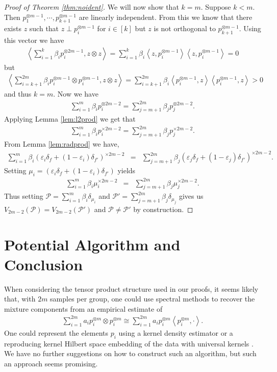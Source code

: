 \documentclass{article} %
\def\l{\left}
\def\r{\right}
\def\sP{\mathscr{P}}
\theoremstyle{definition}
\begin{document}
\begin{proof}[Proof of Theorem \ref{thm:noident}]
We will now show that $k=m$. Suppose $k<m$. Then $p_1^{\otimes m-1}, \cdots , p_{k+1}^{\otimes m-1}$ are linearly independent. From this we know that there exists $z$ such that $z\perp p_i^{\otimes m-1}$ for $i\in [k]$ but $z$ is not orthogonal to $p_{k+1}^{\otimes m-1}$. Using this vector we have
\begin{eqnarray*}
	\l<\sum_{i=1}^{k}\beta_i p_i^{\otimes 2m-1},z\otimes z\r>
	=\sum_{i=1}^{k}\beta_i\l<z, p_i^{\otimes m-1}\r>\l<z, p_i^{\otimes m-1}\r>
	=0 
\end{eqnarray*}
but
\begin{eqnarray*}
	\l< \sum_{i=k+1}^{2m}\beta_i p_i^{\otimes m-1}\otimes p_i^{\otimes m-1}, z\otimes z\r>
	= \sum_{i=k+1}^{2m}\beta_i\l<  p_i^{\otimes m-1}, z\r>\l<  p_i^{\otimes m-1}, z\r>
	>0
\end{eqnarray*}
and thus $k=m$.
Now we have
\begin{eqnarray*}
	\sum_{i=1}^m \beta_i p_i^{\otimes 2m-2} = \sum_{j=m+1}^{2m}\beta_j p_j^{\otimes 2m-2}.
\end{eqnarray*}
Applying Lemma \ref{lem:l2prod} we get that
\begin{eqnarray*}
	\sum_{i=1}^m \beta_i p_i^{\times 2m-2} = \sum_{j=m+1}^{2m}\beta_j p_j^{\times 2m-2}.
\end{eqnarray*}
From Lemma \ref{lem:radprod} we have,
\begin{eqnarray*}
	 \sum_{i=1}^m  \beta_i \left( \varepsilon_i \delta_f + \left( 1-\varepsilon_i \right) \delta_{f'} \right)^{\times 2m-2}   &=& \sum_{j=m+1}^{2m} \beta_j \left( \varepsilon_j \delta_f + \left( 1-\varepsilon_j \right) \delta_{f'} \right)^{\times 2m-2}.
\end{eqnarray*}
Setting $\mu_i = \left( \varepsilon_i \delta_{f} + \left( 1-\varepsilon_i \right)\delta_{f'} \right)$ yields
\begin{eqnarray*}
	\sum_{i=1}^m  \beta_i \mu_i^{\times 2m-2}  &=& \sum_{j=m+1}^{2m} \beta_j \mu_j^{\times 2m-2}.
\end{eqnarray*}
Thus setting $\sP = \sum_{i=1}^m  \beta_i \delta_{\mu_i}$ and $\sP' = \sum_{j=m+1}^{2m} \beta_j \delta_{\mu_j}$ gives us $V_{2m-2}\left( \sP \right) = V_{2m-2}\left( \sP' \right)$ and $\sP \neq \sP'$ by construction. 
\end{proof}
\section{Potential Algorithm and Conclusion}
When considering the tensor product structure used in our proofs, it seems likely that, with $2m$ samples per group, one could use spectral methods to recover the mixture components from an empirical estimate of
\begin{eqnarray*}
	\sum_{i=1}^{2m} a_i p_i^{\otimes m} \otimes p_i^{\otimes m} \cong \sum_{i=1}^{2m} a_i p_i^{\otimes m}  \l<p_i^{\otimes m},\cdot\r>.
\end{eqnarray*}
One could represent the elements $p_i$ using a kernel density estimator or a reproducing kernel Hilbert space embedding of the data with universal kernels \cite{christmann10}. We have no further suggestions on how to construct such an algorithm, but such an approach seems promising.
\end{document}
